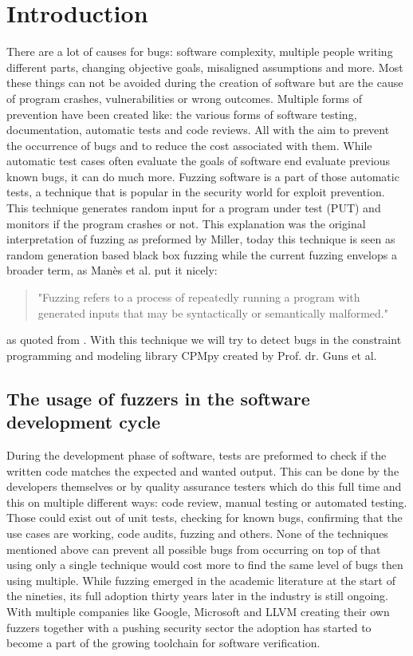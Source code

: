 \chapter{Introduction}
\label{cha:intro}
There are a lot of causes for bugs: software complexity, multiple people writing different parts, changing objective goals, misaligned assumptions and more. Most these things can not be avoided during the creation of software but are the cause of program crashes, vulnerabilities or wrong outcomes. Multiple forms of prevention have been created like: the various forms of software testing, documentation, automatic tests and code reviews. All with the aim to prevent the occurrence of bugs and to reduce the cost associated with them. While automatic test cases often evaluate the goals of software end evaluate previous known bugs, it can do much more. Fuzzing software is a part of those automatic tests, a technique that is popular in the security world for exploit prevention. This technique generates random input for a program under test (PUT) and monitors if the program crashes or not. This explanation was the original interpretation of fuzzing as preformed by Miller\cite{4originalFuzzingUnixUtils}, today this technique is seen as random  generation based black box fuzzing while the current fuzzing envelops a broader term, as Man\`es et al.\cite{13manes2019survey} put it nicely:
\begin{quote}
"Fuzzing refers to a process of repeatedly running a program with generated inputs that may be syntactically or semantically malformed."
\end{quote} as quoted from \cite{13manes2019survey}.
With this technique we will try to detect bugs in the constraint programming and modeling library CPMpy \cite{17guns2019increasing} created by Prof. dr. Guns et al.


\section{The usage of fuzzers in the software development cycle}
During the development phase of software, tests are preformed to check if the written code matches the expected and wanted output. This can be done by the developers themselves or by quality assurance testers which do this full time and this on multiple different ways: code review, manual testing or automated testing. Those could exist out of unit tests, checking for known bugs, confirming that the use cases are working, code audits, fuzzing and others. None of the techniques mentioned above can prevent all possible bugs from occurring on top of that using only a single technique would cost more to find the same level of bugs then using multiple. While fuzzing emerged in the academic literature at the start of the nineties, its full adoption thirty years later in the industry is still ongoing. With multiple companies like Google, Microsoft and LLVM creating their own fuzzers together with a pushing security sector the adoption has started to become a part of the growing toolchain for software verification.

